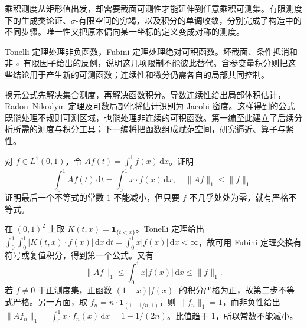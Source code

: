 




\begin{chaptersummary}
乘积测度从矩形值出发，却需要截面可测性才能延伸到任意乘积可测集。有限测度下的生成类论证、\(\sigma\)-有限空间的穷竭，以及积分的单调收敛，分别完成了构造中的不同步骤。唯一性又把原本偏向某一坐标的定义变成对称的测度。

\ProseParagraphBreak

Tonelli 定理处理非负函数，Fubini 定理处理绝对可积函数。坏截面、条件抵消和非 \(\sigma\)-有限因子给出的反例，说明这几项限制不能彼此替代。含参变量积分则把这些结论用于产生新的可测函数；连续性和微分仍需各自的局部共同控制。

\ProseParagraphBreak

换元公式先解决集合测度，再解决函数积分。导数连续性给出局部体积估计，Radon--Nikodym 定理及可数局部化将估计识别为 Jacobi 密度。这样得到的公式既能处理不规则可测区域，也能处理非连续的可积函数。第一编至此建立了后续分析所需的测度与积分工具；下一编将把函数组成赋范空间，研究逼近、算子与紧性。
\end{chaptersummary}


\BookExercises

\begin{exercise}\label{b1:ex:07-triangular-kernel}
对 \(f\in L^1(0,1)\)，令 \(Af(t)=\int_t^1f(x)\,\mathrm{d}x\)。证明
\[
\int_0^1Af(t)\,\mathrm{d}t=\int_0^1x\cdot f(x)\,\mathrm{d}x,
\quad
\|Af\|_1\leq\|f\|_1.
\]
证明最后一个不等式的常数 \(1\) 不能减小，但只要 \(f\) 不几乎处处为零，就有严格不等式。
\end{exercise}
\begin{solution}
在 \((0,1)^2\) 上取 \(K(t,x)=\mathbf1_{\{t<x\}}\)。Tonelli 定理给出
\(\int_0^1\int_0^1|K(t,x)\cdot f(x)|\,\mathrm{d}x\,\mathrm{d}t=\int_0^1x|f(x)|\,\mathrm{d}x<\infty\)，故可用 Fubini 定理交换有符号或复值积分，得到第一个公式。又有
\[
\|Af\|_1\leq\int_0^1x|f(x)|\,\mathrm{d}x\leq\|f\|_1.
\]
若 \(f\neq0\) 于正测度集，正函数 \((1-x)|f(x)|\) 的积分严格为正，故第二步不等式严格。另一方面，取
\(f_n=n\cdot\mathbf1_{(1-1/n,1)}\)，则 \(\|f_n\|_1=1\)，而非负性给出
\(\|Af_n\|_1=\int_0^1x\cdot f_n(x)\,\mathrm{d}x=1-1/(2n)\)。比值趋于 \(1\)，所以常数不能减小。
\end{solution}

